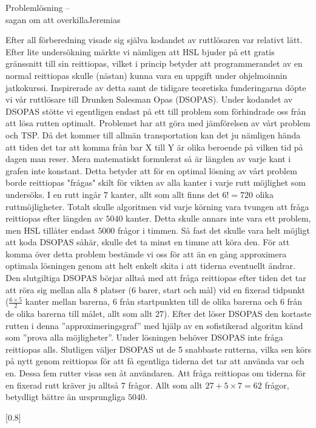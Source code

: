 \documentclass{spektraklet}
\begin{document}
\begin{artikel}{Problemlösning – \\ sagan om att overkilla}{Jeremias}
\begin{twocolumns}
Efter all förberedning visade sig själva kodandet av ruttlösaren var relativt lätt. Efter lite undersökning märkte vi nämligen att HSL bjuder på ett gratis gränssnitt till sin reittiopas, vilket i princip betyder att programmerandet av en normal reittiopas skulle (nästan) kunna vara en uppgift under ohjelmoinnin jatkokurssi. Inspirerade av detta samt de tidigare teoretiska funderingarna döpte vi vår ruttlösare till Drunken Salesman Opas (DSOPAS). Under kodandet av DSOPAS stötte vi egentligen endast på ett till problem som förhindrade oss från att lösa rutten optimalt. Problemet har att göra med jämförelsen av vårt problem och TSP. Då det kommer till allmän transportation kan det ju nämligen hända att tiden det tar att komma från bar X till Y är olika beroende på vilken tid på dagen man reser. Mera matematiskt formulerat så är längden av varje kant i grafen inte konstant. Detta betyder att för en optimal lösning av vårt problem borde reittiopas "frågas" skilt för vikten av alla kanter i varje rutt möjlighet som undersöks. I en rutt ingår $7$ kanter, allt som allt finns det $6! = 720$ olika ruttmöjligheter. Totalt skulle algoritmen vid varje körning vara tvungen att fråga reittiopas efter längden av $5040$ kanter. Detta skulle annars inte vara ett problem, men HSL tillåter endast $5000$ frågor i timmen. Så fast det skulle vara helt möjligt att koda DSOPAS såhär, skulle det ta minst en timme att köra den. För att komma över detta problem bestämde vi oss för att än en gång approximera optimala lösningen genom att helt enkelt skita i att tiderna eventuellt ändrar. Den slutgiltiga DSOPAS börjar alltså med att fråga reittiopas efter tiden det tar att röra sig mellan alla 8 platser (6 barer, start och mål) vid en fixerad tidpunkt ($\frac{6 \times 5}{2}$ kanter mellan barerna, $6$ från startpunkten till de olika barerna och $6$ från de olika barerna till målet, allt som allt $27$). Efter det löser DSOPAS den kortaste rutten i denna ”approximeringsgraf” med hjälp av en sofistikerad algoritm känd som ”prova alla möjligheter”. Under lösningen behöver DSOPAS inte fråga reittiopas alls. Slutligen väljer DSOPAS ut de 5 snabbaste rutterna, vilka sen körs på nytt genom reittiopas för att få egentliga tiderna det tar att använda var och en. Dessa fem rutter visas sen åt användaren. Att fråga reittiopas om tiderna för en fixerad rutt kräver ju alltså $7$ frågor. Allt som allt $27 + 5 \times 7 = 62$ frågor,  betydligt bättre än ursprungliga $5040$.

[0.8\columnwidth]


\end{twocolumns}
\end{artikel}
\end{document}

